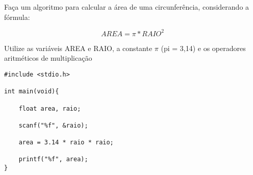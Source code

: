
Faça um algoritmo para calcular a área de uma circunferência, considerando a fórmula:

\begin{equation}
	AREA = \pi * RAIO^2
\end{equation}

Utilize as variáveis AREA e RAIO, a constante $\pi$ (pi = 3,14) e os operadores aritméticos de multiplicação

\begin{solution}
\begin{lstlisting}
#include <stdio.h>

int main(void){

	float area, raio;
	
	scanf("%f", &raio);
	
	area = 3.14 * raio * raio;
	
	printf("%f", area);
}
\end{lstlisting}
\end{solution}

